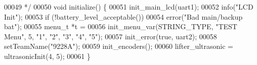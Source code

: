 \begin{DoxyCode}
00049 \textcolor{comment}{ */}
00050 \textcolor{keywordtype}{void} initialize() \{
00051   init_main_lcd(uart1);
00052   info(\textcolor{stringliteral}{"LCD Init"});
00053   \textcolor{keywordflow}{if} (!battery_level_acceptable())
00054     error(\textcolor{stringliteral}{"Bad main/backup bat"});
00055   menu_t *t =
00056       init_menu_var(STRING_TYPE, \textcolor{stringliteral}{"TEST Menu"}, 5, \textcolor{stringliteral}{"1"}, \textcolor{stringliteral}{"2"}, \textcolor{stringliteral}{"3"}, \textcolor{stringliteral}{"4"}, \textcolor{stringliteral}{"5"});
00057   init_error(\textcolor{keyword}{true}, uart2);
00058   setTeamName(\textcolor{stringliteral}{"9228A"});
00059   init_encoders();
00060   lifter_ultrasonic = ultrasonicInit(4, 5);
00061 \}
\end{DoxyCode}
